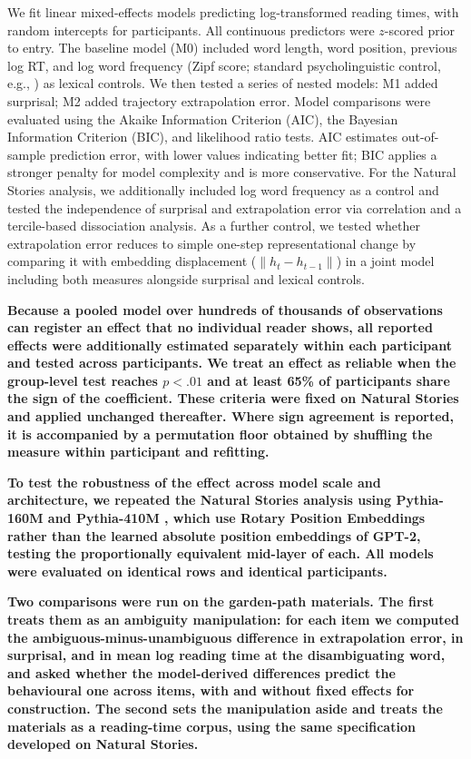 \documentclass[12pt]{article}
\newcommand{\new}[1]{{\bfseries #1}}
\begin{document}
We fit linear mixed-effects models predicting log-transformed reading times, with random intercepts for participants. All continuous predictors were $z$-scored prior to entry. The baseline model (M0) included word length, word position, previous log RT, and log word frequency (Zipf score; standard psycholinguistic control, e.g., \citealp{smith2013}) as lexical controls. We then tested a series of nested models: M1 added surprisal; M2 added trajectory extrapolation error. Model comparisons were evaluated using the Akaike Information Criterion (AIC), the Bayesian Information Criterion (BIC), and likelihood ratio tests. AIC estimates out-of-sample prediction error, with lower values indicating better fit; BIC applies a stronger penalty for model complexity and is more conservative. For the Natural Stories analysis, we additionally included log word frequency as a control and tested the independence of surprisal and extrapolation error via correlation and a tercile-based dissociation analysis. As a further control, we tested whether extrapolation error reduces to simple one-step representational change by comparing it with embedding displacement ($\|h_t - h_{t-1}\|$) in a joint model including both measures alongside surprisal and lexical controls.

\new{Because a pooled model over hundreds of thousands of observations can register an effect that no individual reader shows, all reported effects were additionally estimated separately within each participant and tested across participants. We treat an effect as reliable when the group-level test reaches $p < .01$ and at least 65\% of participants share the sign of the coefficient. These criteria were fixed on Natural Stories and applied unchanged thereafter. Where sign agreement is reported, it is accompanied by a permutation floor obtained by shuffling the measure within participant and refitting.}

\new{To test the robustness of the effect across model scale and architecture, we repeated the Natural Stories analysis using Pythia-160M and Pythia-410M \citep{biderman2023}, which use Rotary Position Embeddings rather than the learned absolute position embeddings of GPT-2, testing the proportionally equivalent mid-layer of each. All models were evaluated on identical rows and identical participants.}

\new{Two comparisons were run on the garden-path materials. The first treats them as an ambiguity manipulation: for each item we computed the ambiguous-minus-unambiguous difference in extrapolation error, in surprisal, and in mean log reading time at the disambiguating word, and asked whether the model-derived differences predict the behavioural one across items, with and without fixed effects for construction. The second sets the manipulation aside and treats the materials as a reading-time corpus, using the same specification developed on Natural Stories.}
\end{document}
